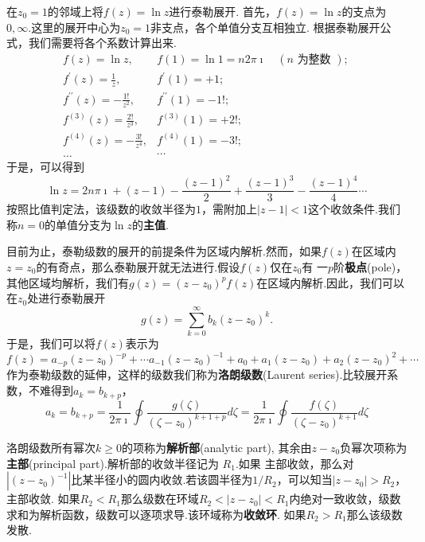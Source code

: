 \begin{examplebox}{在$z_0=1$的邻域上将$f(z) = \ln{z}$进行泰勒展开.}
    首先，$f(z) = \ln z $的支点为$0,\infty$.这里的展开中心为$z_0=1$非支点，各个单值分支互相独立.
    根据泰勒展开公式，我们需要将各个系数计算出来.
    \[
        \begin{array}{ll}
            f(z)=\ln z, & f(1)=\ln 1=n 2 \pi \imath \quad(n \text { 为整数 }) \text {; } \\
            f^{\prime}(z)=\frac{1}{z}, & f^{\prime}(1)=+1 ; \\
            f^{\prime \prime}(z)=-\frac{1 !}{z^2}, & f^{\prime \prime}(1)=-1 ! ; \\
            f^{(3)}(z)=\frac{2 !}{z^3}, & f^{(3)}(1)=+2 ! ; \\
            f^{(4)}(z)=-\frac{3 !}{z^4}, & f^{(4)}(1)=-3 ! ; \\
            \ldots & \cdots
            \end{array}
    \]
    于是，可以得到
    \[
    \ln z = 2 n \pi \imath + (z-1) - \frac{(z-1)^2}{2} +  \frac{(z-1)^3}{3} -  \frac{(z-1)^4}{4} \cdots
    \]
    按照比值判定法，该级数的收敛半径为$1$，需附加上$|z-1|< 1$这个收敛条件.我们称$n=0$的单值分支为$\ln z $的\textbf{主值}.
\end{examplebox}

目前为止，泰勒级数的展开的前提条件为区域内解析.然而，如果$f(z)$在区域内$z=z_0$的有奇点，那么泰勒展开就无法进行.假设$f(z)$仅在$z_0$有
一$p$阶\textbf{极点}(pole)，其他区域均解析，我们有$g(z) = (z-z_0)^p f(z)$在区域内解析.因此，我们可以在$z_0$处进行泰勒展开
\begin{equation}
    g(z) = \sum_{k=0}^{\infty} b_k (z-z_0)^{k} .
\end{equation}
于是，我们可以将$f(z)$表示为
\begin{equation}
    f(z) = a_{-p} (z-z_0)^{-p} + \cdots a_{-1}(z-z_0)^{-1} + a_0 + a_{1} (z-z_0) + a_{2} (z-z_0)^2 + \cdots 
\end{equation}
作为泰勒级数的延伸，这样的级数我们称为\textbf{洛朗级数}(Laurent series).比较展开系数，不难得到$a_k = b_{k+p}$，
\begin{equation}
    a_k = b_{k+p} = \frac{1}{2\pi \imath} \oint \frac{g(\zeta)}{(\zeta - z_0)^{k+1+p}} d\zeta 
    = \frac{1}{2\pi \imath} \oint \frac{f(\zeta)}{(\zeta - z_0)^{k+1}} d\zeta
\end{equation}

洛朗级数所有幂次$k\geq 0$的项称为\textbf{解析部}(analytic part), 其余由$z-z_0$负幂次项称为\textbf{主部}(principal part).解析部的收敛半径记为
$R_1$.如果
主部收敛，那么对$|(z-z_0)^{-1}|$比某半径小的圆内收敛.若该圆半径为$1/R_2$，可以知当$|z-z_0|> R_2$，主部收敛.
如果$R_2 < R_1$那么级数在环域$R_2 < |z- z_0| < R_1$内绝对一致收敛，级数求和为解析函数，级数可以逐项求导.该环域称为\textbf{收敛环}.
如果$R_2 > R_1$那么该级数发散.

